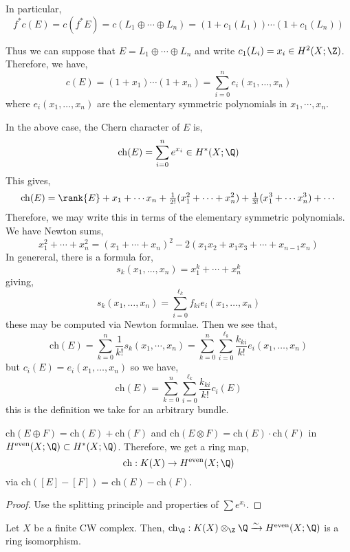 \documentclass[12pt]{extarticle}
\begin{document}
\begin{rmk}
In particular, 
\[ f^* c(E) = c(f^* E) = c(L_1 \oplus \cdots \oplus L_n) = (1 + c_1(L_1)) \cdots (1 + c_1(L_n)) \]
\end{rmk}

\begin{rmk}
Thus we can suppose that $E = L_1 \oplus \cdots \oplus L_n$ and write $c_1(L_i) = x_i \in H^2(X; \Z)$. Therefore, we have,
\[ c(E) = (1 + x_1) \cdots (1 + x_n) = \sum_{i = 0}^n e_i(x_1, \dots, x_n) \]
where $e_i(x_1, \dots, x_n)$ are the elementary symmetric polynomials in $x_1, \cdots, x_n$.
\end{rmk}

\newcommand{\CCh}{\mathrm{ch}}

\begin{defn}
In the above case, the Chern character of $E$ is,
\[ \CCh(E) = \sum_{i = 0}^n e^{x_i} \in H^*(X; \Q) \]
This gives,
\[ \CCh(E) = \rank{E} + x_1 + \cdots x_n + \tfrac{1}{2!} (x_1^2 + \cdots + x_n^2) + \tfrac{1}{3!} (x_1^3 + \cdots x_n^3) + \cdots \]
Therefore, we may write this in terms of the elementary symmetric polynomials. We have Newton sums,
\[ x_1^2 + \cdots + x_n^2 = (x_1 + \cdots + x_n)^2 - 2(x_1 x_2 + x_1 x_3 + \cdots + x_{n-1} x_n) \]
In genereral, there is a formula for,
\[ s_k(x_1, \dots, x_n) = x_1^k + \cdots + x_n^k \]
giving,
\[ s_k(x_1, \dots, x_n) = \sum_{i = 0}^{\ell_k} f_{k i} e_i(x_1, \dots, x_n) \]
these may be computed via Newton formulae. Then we see that,
\[ \CCh(E) = \sum_{k = 0}^n \frac{1}{k!} s_k(x_1, \cdots, x_n) = \sum_{k = 0}^n \sum_{i = 0}^{\ell_k} \frac{k_{ki}}{k!} e_i(x_1, \dots, x_n) \]
but $c_i(E) = e_i(x_1, \dots, x_n)$ so we have,
\[ \CCh(E) =  \sum_{k = 0}^n \sum_{i = 0}^{\ell_k} \frac{k_{ki}}{k!} c_i(E) \]
this is the definition we take for an arbitrary bundle.
\end{defn}

\begin{lemma}
$\CCh(E \oplus F) = \CCh(E) + \CCh(F)$ and $\CCh(E \otimes F) = \CCh(E) \cdot \CCh(F)$ in $H^{\text{even}}(X; \Q) \subset H^*(X; \Q)$.
Therefore, we get a ring map,
\[ \CCh : K(X) \to H^{\text{even}}(X; \Q) \] 
via $\CCh([E] - [F]) = \CCh(E) - \CCh(F)$. 
\end{lemma}

\begin{proof}
Use the splitting principle and properties of $\sum e^{x_i}$. 
\end{proof}

\begin{theorem}
Let $X$ be a finite CW complex. Then,
$\CCh_\Q : K(X) \otimes_\Z \Q \xrightarrow{\sim} H^{\text{even}}(X; \Q)$ is a ring isomorphism. 
\end{theorem}
\end{document}

